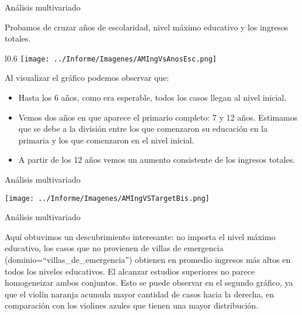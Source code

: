 \documentclass[pdf]{beamer}
\begin{document}
\begin{frame}{Análisis multivariado}
    \footnotesize

    Probamos de cruzar años de escolaridad, nivel máximo educativo y los ingresos totales.

    \begin{wrapfigure}{l}{0.6\textwidth}
        \texttt{[image: ../Informe/Imagenes/AMIngVsAnosEsc.png]}
    \end{wrapfigure}

    Al visualizar el gráfico podemos observar que:

    \begin{itemize}
        \item Hasta los 6 años, como era esperable, todos los casos llegan al nivel inicial.
        \item Vemos dos años en que aparece el primario completo: 7 y 12 años. Estimamos que se debe a la división entre los que comenzaron su educación en la primaria y los que comenzaron en el nivel inicial.
        \item A partir de los 12 años vemos un aumento consistente de los ingresos totales.
    \end{itemize}

\end{frame} 

\begin{frame}{Análisis multivariado}

    \begin{center}
        \texttt{[image: ../Informe/Imagenes/AMIngVSTargetBis.png]}
    \end{center}

\end{frame}

\begin{frame}{Análisis multivariado}

    Aquí obtuvimos un descubrimiento interesante: no importa el nivel máximo educativo, los casos que no provienen de villas de emergencia (dominio=``villas\_de\_emergencia'') obtienen en promedio ingresos más altos en todos los niveles educativos. El alcanzar estudios superiores no parece homogeneizar ambos conjuntos. Esto se puede observar en el segundo gráfico, ya que el violín naranja acumula mayor cantidad de casos hacia la derecha, en comparación con los violines azules que tienen una mayor distribución.

\end{frame}
\end{document}
